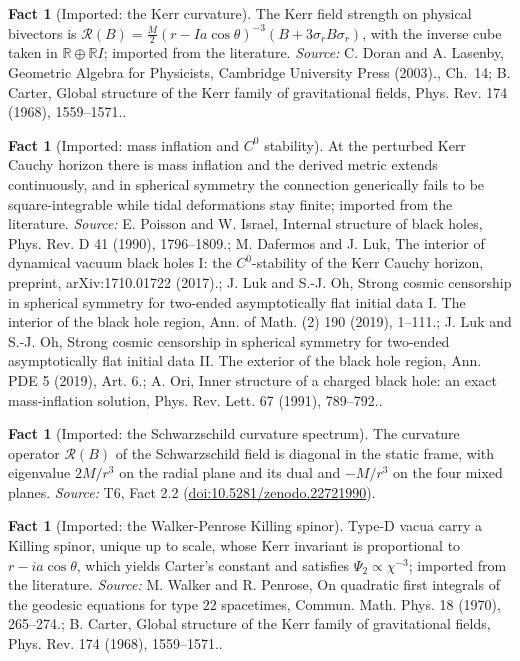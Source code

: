 \documentclass[11pt]{article}
\theoremstyle{definition}
\newtheorem{fact}[theorem]{Fact}
\theoremstyle{plain}
\providecommand{\R}{}\renewcommand{\R}{\mathbb{R}}
\begin{document}
\begin{fact}[Imported: the Kerr curvature]\label{c:interior.imported-kerr-curvature}
The Kerr field strength on physical bivectors is $\mathcal{R}(B) = \tfrac{M}{2}(r - Ia\cos\theta)^{-3}(B + 3\sigma_r B\sigma_r)$, with the inverse cube taken in $\R \oplus \R I$; imported from the literature.
\emph{Source:} C. Doran and A. Lasenby, Geometric Algebra for Physicists, Cambridge University Press (2003)., Ch.~14; B. Carter, Global structure of the Kerr family of gravitational fields, Phys. Rev. 174 (1968), 1559--1571..
\end{fact}

\begin{fact}[Imported: mass inflation and $C^0$ stability]\label{c:interior.imported-mass-inflation-stability}
At the perturbed Kerr Cauchy horizon there is mass inflation and the derived metric extends continuously, and in spherical symmetry the connection generically fails to be square-integrable while tidal deformations stay finite; imported from the literature.
\emph{Source:} E. Poisson and W. Israel, Internal structure of black holes, Phys. Rev. D 41 (1990), 1796--1809.; M. Dafermos and J. Luk, The interior of dynamical vacuum black holes I: the $C^0$-stability of the Kerr Cauchy horizon, preprint, arXiv:1710.01722 (2017).; J. Luk and S.-J. Oh, Strong cosmic censorship in spherical symmetry for two-ended asymptotically flat initial data I. The interior of the black hole region, Ann. of Math. (2) 190 (2019), 1--111.; J. Luk and S.-J. Oh, Strong cosmic censorship in spherical symmetry for two-ended asymptotically flat initial data II. The exterior of the black hole region, Ann. PDE 5 (2019), Art. 6.; A. Ori, Inner structure of a charged black hole: an exact mass-inflation solution, Phys. Rev. Lett. 67 (1991), 789--792..
\end{fact}

\begin{fact}[Imported: the Schwarzschild curvature spectrum]\label{c:interior.imported-schwarzschild-curvature-spectrum}
The curvature operator $\mathcal{R}(B)$ of the Schwarzschild field is diagonal in the static frame, with eigenvalue $2M/r^3$ on the radial plane and its dual and $-M/r^3$ on the four mixed planes.
\emph{Source:} T6, Fact 2.2 (\href{https://doi.org/10.5281/zenodo.22721990}{doi:10.5281/zenodo.22721990}).
\end{fact}

\begin{fact}[Imported: the Walker-Penrose Killing spinor]\label{c:interior.imported-walker-penrose-killing-spinor}
Type-D vacua carry a Killing spinor, unique up to scale, whose Kerr invariant is proportional to $r - ia\cos\theta$, which yields Carter's constant and satisfies $\Psi_2 \propto \chi^{-3}$; imported from the literature.
\emph{Source:} M. Walker and R. Penrose, On quadratic first integrals of the geodesic equations for type $22$ spacetimes, Commun. Math. Phys. 18 (1970), 265--274.; B. Carter, Global structure of the Kerr family of gravitational fields, Phys. Rev. 174 (1968), 1559--1571..
\end{fact}
\end{document}

